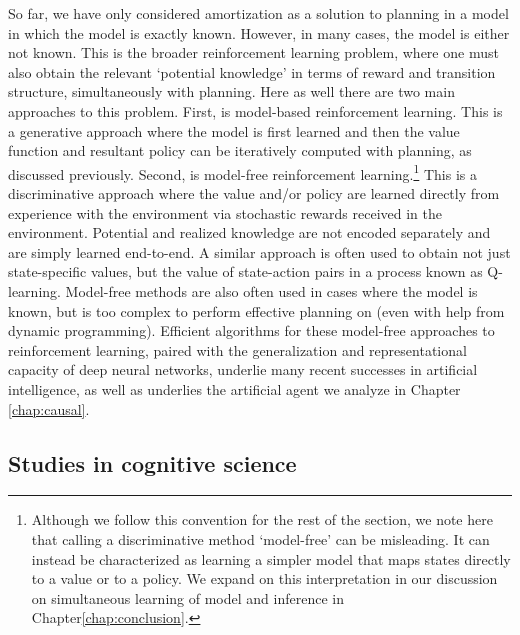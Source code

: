 So far, we have only considered amortization as a solution to planning in a model in which the model is exactly known. However, in many cases, the model is either not known.
This is the broader reinforcement learning problem, where one must also obtain the relevant `potential knowledge' in terms of reward and transition structure, simultaneously with planning. Here as well there are two main approaches to this problem. First, is model-based reinforcement learning. This is a generative approach where the model is first learned and then the value function and resultant policy can be iteratively computed with planning, as discussed previously. Second, is model-free reinforcement learning.\footnote{Although we follow this convention for the rest of the section, we note here that calling a discriminative method `model-free' can be misleading. It can instead be characterized as learning a simpler model that maps states directly to a value or to a policy. We expand on this interpretation in our discussion on simultaneous learning of model and inference in Chapter\ref{chap:conclusion}.} This is a discriminative approach where the value and/or policy are learned directly from experience with the environment via stochastic rewards received in the environment. Potential and realized knowledge are not encoded separately and are simply learned end-to-end. A similar approach is often used to obtain not just state-specific values, but the value of state-action pairs in a process known as Q-learning\citep{watkins1992q}. Model-free methods are also often used in cases where the model is known, but is too complex to perform effective planning on (even with help from dynamic programming). Efficient algorithms for these model-free approaches to reinforcement learning, paired with the generalization and representational capacity of deep neural networks, underlie many recent successes in artificial intelligence\citep{mnih2013playing}, as well as underlies the artificial agent we analyze in Chapter \ref{chap:causal}. %

\subsection*{Studies in cognitive science}

